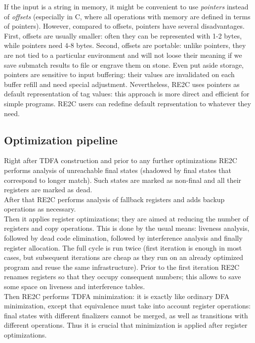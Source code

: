 \documentclass{article}
\theoremstyle{definition}
\begin{document}
\begin{multicols}{2}
If the input is a string in memory, it might be convenient to use \emph{pointers} instead of \emph{offsets}
(especially in C, where all operations with memory are defined in terms of pointers).
However, compared to offsets, pointers have several disadvantages.
First, offsets are usually smaller: often they can be represented with 1-2 bytes, while pointers need 4-8 bytes.
Second, offsets are portable: unlike pointers, they are not tied to a particular environment
and will not loose their meaning if we save submatch results to file or engrave them on stone.
Even put aside storage, pointers are sensitive to input buffering:
their values are invalidated on each buffer refill and need special adjustment.
Nevertheless, RE2C uses pointers as default representation of tag values:
this approach is more direct and efficient for simple programs.
RE2C users can redefine default reprsentation to whatever they need.

\subsection*{Optimization pipeline}

Right after TDFA construction and prior to any further optimizations
RE2C performs analysis of unreachable final states
(shadowed by final states that correspond to longer match).
Such states are marked as non-final and all their registers are marked as dead.
\\

After that RE2C performs analysis of fallback registers and adds backup operations as necessary.
\\

Then it applies register optimizations;
they are aimed at reducing the number of registers and copy operations.
This is done by the usual means:
liveness analysis, followed by dead code elimination,
followed by interference analysis and finally register allocation.
The full cycle is run twice (first iteration is enough in most cases,
but subsequent iterations are cheap as they run on an already optimized program and reuse the same infrastructure).
Prior to the first iteration RE2C renames registers so that they occupy consequent numbers;
this allows to save some space on liveness and interference tables.
\\

Then RE2C performs TDFA minimization:
it is exactly like ordinary DFA minimization, except that
equivalence must take into account register operations:
final states with different finalizers cannot be merged, as well as transitions with different operations.
Thus it is crucial that minimization is applied after register optimizations.
\\


\end{multicols}
\end{document}
